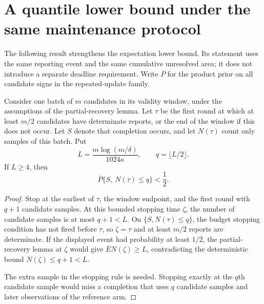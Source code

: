 \section{A quantile lower bound under the same maintenance protocol}
\label{sec:quantile_extension}

The following result strengthens the expectation lower bound. Its statement
uses the same reporting event and the same cumulative unresolved area; it does
not introduce a separate deadline requirement. Write $\overline P$ for the
product prior on all candidate signs in the repeated-update family.

\begin{lemma}
\label{lem:budget_completion}
Consider one batch of $m$ candidates in its validity window, under the
assumptions of the partial-recovery lemma. Let $\tau$ be the first round at
which at least $m/2$ candidates have determinate reports, or the end of the
window if this does not occur. Let $S$ denote that completion occurs, and let
$N(\tau)$ count only samples of this batch. Put
\[
 L=\frac{m\log(m/\delta)}{1024\kappa},\qquad
 q=\lfloor L/2\rfloor.
\]
If $L\ge4$, then
\[
 \overline P\{S,\ N(\tau)\le q\}<\frac12.
\]
\end{lemma}
\begin{proof}
Stop at the earliest of $\tau$, the window endpoint, and the first round with
$q+1$ candidate samples. At this bounded stopping time $\zeta$, the number of
candidate samples is at most $q+1<L$. On $\{S,N(\tau)\le q\}$, the budget
stopping condition has not fired before $\tau$, so $\zeta=\tau$ and at least
$m/2$ reports are determinate. If the displayed event had probability at least
$1/2$, the partial-recovery lemma at $\zeta$ would give
$\overline E N(\zeta)\ge L$, contradicting the deterministic bound
$N(\zeta)\le q+1<L$.

The extra sample in the stopping rule is needed. Stopping exactly at the
$q$th candidate sample would miss a completion that uses $q$ candidate
samples and later observations of the reference arm.
\end{proof}


